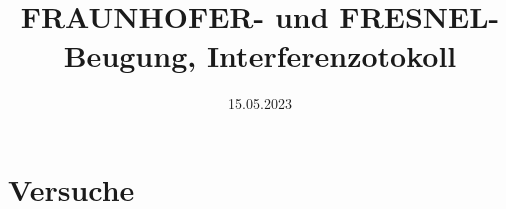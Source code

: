 
\usepackage{subfiles}

\title{FRAUNHOFER- und FRESNEL-Beugung, Interferenzotokoll}
\date{15.05.2023}


\maketitle


\newpage

\newpage
\part{Versuche}

\newpage

